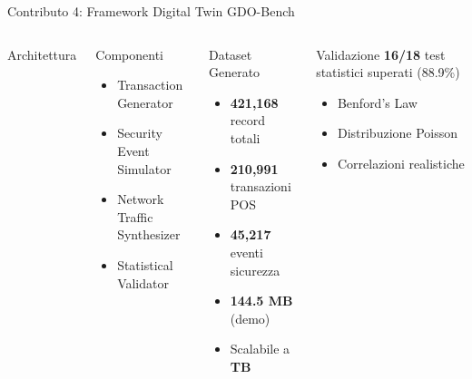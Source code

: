 \documentclass[aspectratio=169,10pt]{beamer}
\begin{document}
\begin{frame}{Contributo 4: Framework Digital Twin GDO-Bench}
\begin{columns}[T]
\begin{block}{Architettura}
\begin{center}
\end{center}
\end{block}

\begin{block}{Componenti}
\begin{itemize}
    \item Transaction Generator
    \item Security Event Simulator
    \item Network Traffic Synthesizer
    \item Statistical Validator
\end{itemize}
\end{block}

\begin{exampleblock}{Dataset Generato}
\begin{itemize}
    \item \textbf{421,168} record totali
    \item \textbf{210,991} transazioni POS
    \item \textbf{45,217} eventi sicurezza
    \item \textbf{144.5 MB} (demo)
    \item Scalabile a \textbf{TB}
\end{itemize}
\end{exampleblock}

\begin{alertblock}{Validazione}
\textbf{16/18} test statistici superati (88.9\%)
\begin{itemize}
    \item[\checkmark] Benford's Law
    \item[\checkmark] Distribuzione Poisson
    \item[\checkmark] Correlazioni realistiche
\end{itemize}
\end{alertblock}
\end{columns}
\end{frame}
\end{document}
